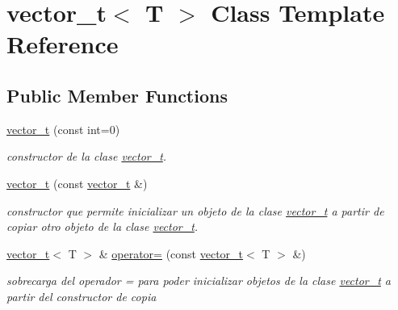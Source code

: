 \hypertarget{classvector__t}{}\section{vector\+\_\+t$<$ T $>$ Class Template Reference}
\label{classvector__t}
\subsection*{Public Member Functions}
\begin{DoxyCompactItemize}
\item 
\mbox{\label{classvector__t_a1b574675f370c6e8ca1ffa1e6c760e82}} 
\hyperlink{classvector__t_a1b574675f370c6e8ca1ffa1e6c760e82}{vector\+\_\+t} (const int=0)
\begin{DoxyCompactList}\small\item\em constructor de la clase \hyperlink{classvector__t}{vector\+\_\+t}. \end{DoxyCompactList}\item 
\mbox{\label{classvector__t_a1f513bf5bf1305e5847e723d7c5d84a4}} 
\hyperlink{classvector__t_a1f513bf5bf1305e5847e723d7c5d84a4}{vector\+\_\+t} (const \hyperlink{classvector__t}{vector\+\_\+t} \&)
\begin{DoxyCompactList}\small\item\em constructor que permite inicializar un objeto de la clase \hyperlink{classvector__t}{vector\+\_\+t} a partir de copiar otro objeto de la clase \hyperlink{classvector__t}{vector\+\_\+t}. \end{DoxyCompactList}\item 
\mbox{\label{classvector__t_a44ee95cba66ece73a42fae2d8e2ac884}} 
\hyperlink{classvector__t}{vector\+\_\+t}$<$ T $>$ \& \hyperlink{classvector__t_a44ee95cba66ece73a42fae2d8e2ac884}{operator=} (const \hyperlink{classvector__t}{vector\+\_\+t}$<$ T $>$ \&)
\begin{DoxyCompactList}\small\item\em sobrecarga del operador = para poder inicializar objetos de la clase \hyperlink{classvector__t}{vector\+\_\+t} a partir del constructor de copia \end{DoxyCompactList}\item 
\mbox{\label{classvector__t_aea862b224c217c1080ea72d8d6ffed5a}} 

\end{DoxyCompactItemize}
